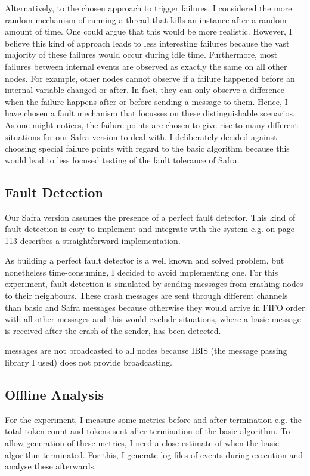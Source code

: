 Alternatively, to the chosen approach to trigger failures, I considered the more random mechanism of running a thread that kills an instance after a random amount of time.
One could argue that this would be more realistic.
However, I believe this kind of approach leads to less interesting failures because the vast majority of these failures would occur during idle time.
Furthermore, most failures between internal events are observed as exactly the same on all other nodes.
For example, other nodes cannot observe if a failure happened before an internal variable changed or after.
In fact, they can only observe a difference when the failure happens after or before sending a message to them.
Hence, I have chosen a fault mechanism that focusses on these distinguishable scenarios.
As one might notices, the failure points are chosen to give rise to many different situations for our Safra version to deal with.
I deliberately decided against choosing special failure points with regard to the basic algorithm because this would lead to less focused testing of the fault tolerance of Safra.

\subsection{Fault Detection}
Our Safra version assumes the presence of a perfect fault detector.
This kind of fault detection is easy to implement and integrate with the system e.g.
\cite{Fokkink:2018} on page 113 describes a straightforward implementation.

As building a perfect fault detector is a well known and solved problem, but nonetheless time-consuming, I decided to avoid implementing one.
For this experiment, fault detection is simulated by sending  messages from crashing nodes to their neighbours.
These crash messages are sent through different channels than basic and Safra messages because otherwise they would arrive in FIFO order with all other messages and this would exclude situations, where a basic message is received after the crash of the sender, has been detected.

 messages are not broadcasted to all nodes because IBIS (the message passing library I used) does not provide broadcasting.

\subsection{Offline Analysis}
\label{ssec:offline-analysis}
For the experiment, I measure some metrics before and after termination e.g. the total token count and tokens sent after termination of the basic algorithm.
To allow generation of these metrics, I need a close estimate of when the basic algorithm terminated.
For this, I generate log files of events during execution and analyse these afterwards.

